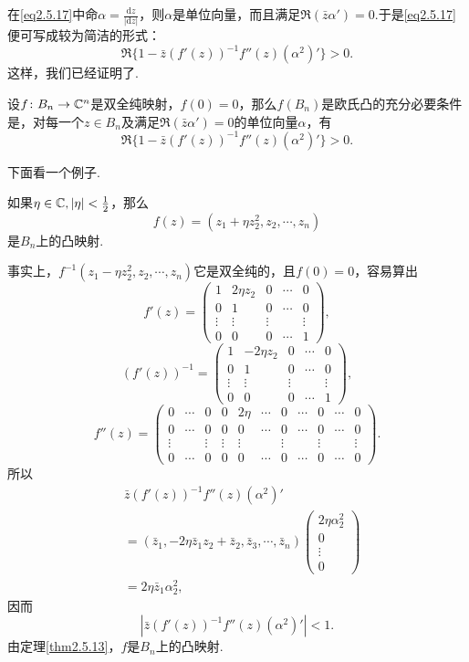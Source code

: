 在\eqref{eq2.5.17}中命$\alpha=\frac{\mathrm{d}z}{|\mathrm{d}z|}$，则$\alpha$是单位向量，而且满足$\Re(\bar{z}\alpha')=0$.于是\eqref{eq2.5.17}便可写成较为简洁的形式：
\begin{equation}\label{eq2.5.18}
	\Re\{1-\bar{z}(f'(z))^{-1} f''(z)(\alpha^2)'\}>0.
\end{equation}
这样，我们已经证明了.
\begin{theorem}\label{thm2.5.13}
	设$f\colon B_n\to\mathbb C^n$是双全纯映射，$f(0)=0$，那么$f(B_n)$是欧氏凸的充分必要条件是，对每一个$z\in B_n$及满足$\Re(\bar{z}\alpha')=0$的单位向量$\alpha$，有
	\[\Re\{1-\bar{z}(f'(z))^{-1} f''(z)(\alpha^2)'\}>0.\]
\end{theorem}
下面看一个例子.
\begin{example}\label{exa2.5.14}
	如果$\eta\in\mathbb C,|\eta|<\frac12$，那么
	\[f(z)=(z_1+\eta z_2^2,z_2,\cdots,z_n)\]
	是$B_n$上的凸映射.
\end{example}
\begin{solution}
	事实上，$f^{-1}(z_1-\eta z_2^2,z_2,\cdots,z_n)$它是双全纯的，且$f(0)=0$，容易算出
	\[f'(z)=\begin{pmatrix}
		1 & 2\eta z_2 & 0 & \cdots & 0\\
		0 & 1 & 0 &\cdots & 0\\
		\vdots & \vdots & \vdots & & \vdots\\
		0& 0 &0 &\cdots &1
	\end{pmatrix},\]
\[(f'(z))^{-1}=\begin{pmatrix}
	1 & -2\eta z_2 & 0 & \cdots & 0\\
	0 & 1 & 0 &\cdots & 0\\
	\vdots & \vdots & \vdots & & \vdots\\
	0& 0 &0 &\cdots &1
\end{pmatrix},\]
\[f''(z)=
\left(\begin{array}{ccccccccccc}
	0 & \cdots &0& 0&2\eta &\cdots &0&\cdots&0&\cdots &0\\
	0 & \cdots &0& 0&0 &\cdots &0&\cdots&0&\cdots &0\\
	\vdots &  &\vdots&\vdots&\vdots& &\vdots&&\vdots&&\vdots\\
	0 & \cdots &0& 0&0&\cdots &0&\cdots&0&\cdots &0
\end{array}
\right).\]
所以
\begin{align*}
	&\bar{z}(f'(z))^{-1}f''(z)(\alpha^2)'\\
	&=(\bar{z}_1,-2\eta\bar{z}_1z_2+\bar{z}_2,\bar{z}_3,\cdots,\bar{z}_n)\left(\begin{array}{c}
		2\eta\alpha_2^2\\
		0\\
		\vdots\\
		0
	\end{array}\right)\\
&=2\eta\bar{z}_1\alpha_2^2,
\end{align*}
因而
\[|\bar{z}(f'(z))^{-1}f''(z)(\alpha^2)'|<1.\]
由定理\ref{thm2.5.13}，$f$是$B_n$上的凸映射.
\end{solution}
